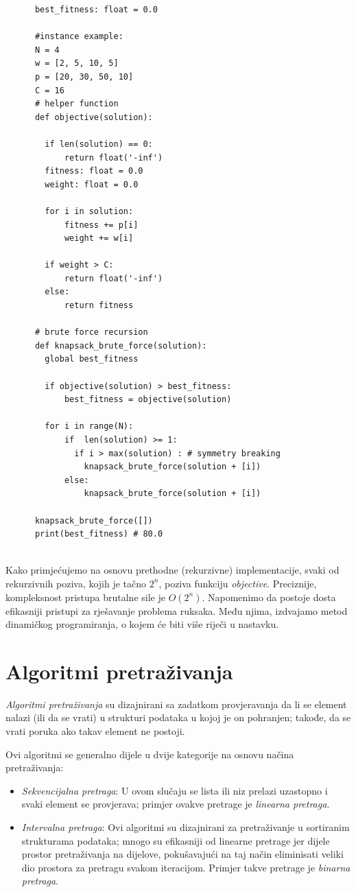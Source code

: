 \begin{verbatim}
	  best_fitness: float = 0.0
	  
	  #instance example:
	  N = 4
	  w = [2, 5, 10, 5]
	  p = [20, 30, 50, 10]
	  C = 16
	  # helper function
	  def objective(solution):
	  
	  	if len(solution) == 0: 
	  		return float('-inf')
	  	fitness: float = 0.0
	  	weight: float = 0.0
	  
	  	for i in solution: 
	  		fitness += p[i]
	  		weight += w[i]
	  
	  	if weight > C:
	  		return float('-inf')
	  	else:
	  		return fitness
	  
	  # brute force recursion
	  def knapsack_brute_force(solution): 
	  	global best_fitness
	  
	  	if objective(solution) > best_fitness:
	  		best_fitness = objective(solution) 
	  
	  	for i in range(N):
	  		if  len(solution) >= 1: 
	  		  if i > max(solution) : # symmetry breaking 
	  			knapsack_brute_force(solution + [i]) 
	  		else:
	  			knapsack_brute_force(solution + [i]) 
	  
	  knapsack_brute_force([])
	  print(best_fitness) # 80.0	
	  
\end{verbatim}


Kako primjećujemo na osnovu prethodne (rekurzivne) implementacije, svaki od  
rekurzivnih poziva, kojih je tačno $2^n$, poziva funkciju \textit{objective}. Preciznije, kompleksnost pristupa brutalne sile je $O(2^n)$. Napomenimo da postoje dosta efikasniji pristupi za rješavanje problema ruksaka. Među njima, izdvajamo metod dinamičkog programiranja, o kojem će biti više riječi u nastavku.


\section{Algoritmi pretraživanja}
\textit{Algoritmi pretraživanja} su dizajnirani sa zadatkom provjeravanja da li se element nalazi (ili da se vrati) u strukturi podataka u kojoj je on pohranjen; takođe,  da se vrati poruka ako takav element ne postoji.

Ovi algoritmi se generalno dijele u dvije kategorije na osnovu načina pretraživanja:

\begin{itemize}
	\item \textit{Sekvencijalna pretraga}: U ovom slučaju se lista ili niz prelazi uzastopno i svaki element se provjerava; primjer ovakve pretrage je \textit{linearna pretraga}.
	\item \textit{Intervalna pretraga}: Ovi algoritmi su   dizajnirani za pretraživanje u sortiranim strukturama podataka; mnogo su efikasniji od linearne pretrage jer dijele prostor pretraživanja na dijelove,  pokušavajući na taj način eliminisati veliki dio prostora za pretragu svakom iteracijom. Primjer takve pretrage je \textit{binarna pretraga}.
\end{itemize}

